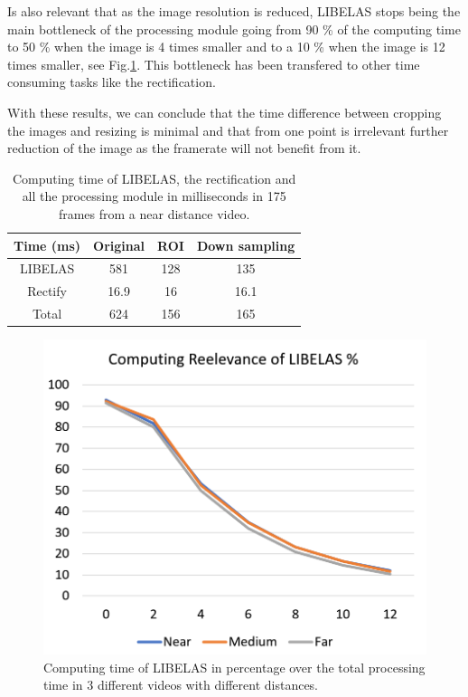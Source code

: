 \documentclass[10pt,a4paper,twocolumn,twoside]{article}
\begin{document}
	Is also relevant that as the image resolution is reduced, LIBELAS stops being the main bottleneck of the processing module going from 90 \% of the computing time to 50 \% when the image is 4 times smaller and to a 10 \% when the image is 12 times smaller, see Fig.\ref{fig:libelaspercentatge}. This bottleneck has been transfered to other time consuming tasks like the rectification.
	
	With these results, we can conclude that the time difference between cropping the images and resizing is minimal and that from one point is irrelevant further reduction of the image as the framerate will not benefit from it.  
	
	\begin{table}
		\centering
		\begin{tabular}{@{}cccc@{}}
			\toprule
			Time (ms) & Original & ROI & Down sampling \\ \midrule
			LIBELAS   & 581      & 128 & 135           \\
			Rectify   & 16.9     & 16  & 16.1          \\
			Total     & 624      & 156 & 165           \\ \bottomrule
		\end{tabular}
		\caption{Computing time of LIBELAS, the rectification and all the processing module in milliseconds in 175 frames from a near distance video.}
		\label{tab:timeprocess}
	\end{table}
	
	\begin{figure}
		\centering
		\includegraphics[width=1\linewidth]{img/ComputingLibelas.PNG}
		\caption{Computing time of LIBELAS in percentage over the total processing time in 3 different videos with different distances.}
		\label{fig:libelaspercentatge}
	\end{figure}
	
\end{document}
